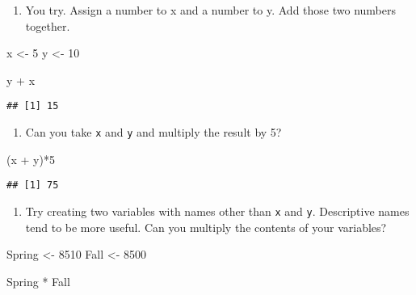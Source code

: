 \documentclass[
]{article}
\newenvironment{Shaded}{\begin{snugshade}}{\end{snugshade}}
\newcommand{\DecValTok}[1]{\textcolor[rgb]{0.00,0.00,0.81}{#1}}
\newcommand{\NormalTok}[1]{#1}
\newcommand{\OtherTok}[1]{\textcolor[rgb]{0.56,0.35,0.01}{#1}}
\newcommand{\SpecialCharTok}[1]{\textcolor[rgb]{0.00,0.00,0.00}{#1}}
\providecommand{\tightlist}{%
  \setlength{\itemsep}{0pt}\setlength{\parskip}{0pt}}
\begin{document}
\begin{enumerate}
\def\labelenumi{(\arabic{enumi})}
\setcounter{enumi}{10}
\tightlist
\item
  You try. Assign a number to x and a number to y. Add those two numbers
  together.
\end{enumerate}

\begin{Shaded}
\begin{Highlighting}[]
\NormalTok{x }\OtherTok{\textless{}{-}} \DecValTok{5}
\NormalTok{y }\OtherTok{\textless{}{-}} \DecValTok{10}

\NormalTok{y }\SpecialCharTok{+}\NormalTok{ x}
\end{Highlighting}
\end{Shaded}

\begin{verbatim}
## [1] 15
\end{verbatim}

\begin{enumerate}
\def\labelenumi{(\arabic{enumi})}
\setcounter{enumi}{11}
\tightlist
\item
  Can you take \texttt{x} and \texttt{y} and multiply the result by 5?
\end{enumerate}

\begin{Shaded}
\begin{Highlighting}[]
\NormalTok{(x }\SpecialCharTok{+}\NormalTok{ y)}\SpecialCharTok{*}\DecValTok{5}
\end{Highlighting}
\end{Shaded}

\begin{verbatim}
## [1] 75
\end{verbatim}

\begin{enumerate}
\def\labelenumi{(\arabic{enumi})}
\setcounter{enumi}{12}
\tightlist
\item
  Try creating two variables with names other than \texttt{x} and
  \texttt{y}. Descriptive names tend to be more useful. Can you multiply
  the contents of your variables?
\end{enumerate}

\begin{Shaded}
\begin{Highlighting}[]
\NormalTok{Spring }\OtherTok{\textless{}{-}} \DecValTok{8510}
\NormalTok{Fall }\OtherTok{\textless{}{-}} \DecValTok{8500}

\NormalTok{Spring }\SpecialCharTok{*}\NormalTok{ Fall}
\end{Highlighting}
\end{Shaded}
\end{document}
